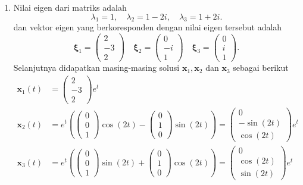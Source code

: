 \documentclass[a4paper]{article}
\theoremstyle{definisi}
\newcommand{\bfxi}{\boldsymbol{\xi}}
\numberwithin{equation}{section}
\begin{document}
\begin{enumerate}
    \item Nilai eigen dari matriks adalah
    \[\lambda_1 = 1, \quad \lambda_2 = 1 -2i, \quad \lambda_3 = 1 + 2i.\]
    dan vektor eigen yang berkoresponden dengan nilai eigen tersebut adalah
    \[\bfxi_1 = \begin{pmatrix}2\\-3\\2\end{pmatrix} \quad \bfxi_2 = \begin{pmatrix}0\\-i\\1\end{pmatrix} \quad \bfxi_3 = \begin{pmatrix}0\\i\\1\end{pmatrix}.\]
    Selanjutnya didapatkan masing-masing solusi $\mathbf{x}_1, \mathbf{x}_2$ dan $\mathbf{x}_3$ sebagai berikut
    \begin{align*}
      \mathbf{x}_1(t) &= \begin{pmatrix}2\\-3\\2\end{pmatrix}e^t\\
      \mathbf{x}_2(t) &= e^t \left(\begin{pmatrix}0\\0\\1\end{pmatrix}\cos(2t) - \begin{pmatrix}0\\1\\0\end{pmatrix}\sin(2t)\right)=\begin{pmatrix}0\\-\sin(2t)\\ \cos(2t)\end{pmatrix}e^t\\
      \mathbf{x}_3(t) &= e^t \left(\begin{pmatrix}0\\0\\1\end{pmatrix}\sin(2t) + \begin{pmatrix}0\\1\\0\end{pmatrix}\cos(2t)\right)=\begin{pmatrix}0\\ \cos(2t)\\ \sin(2t)\end{pmatrix}e^t

\end{align*}
\end{enumerate}
\end{document}

